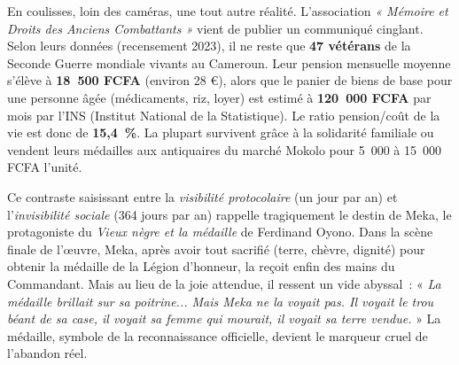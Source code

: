 \documentclass[11pt]{article}
\newcommand{\cle}[1]{{\popxbold\color{popdark}#1}}
\begin{document}
\noindent En coulisses, loin des caméras, une tout autre réalité. L'association \emph{« Mémoire et Droits des Anciens Combattants »} vient de publier un communiqué cinglant. Selon leurs données (recensement 2023), il ne reste que \textbf{47 vétérans} de la Seconde Guerre mondiale vivants au Cameroun. Leur pension mensuelle moyenne s'élève à \textbf{18~500 FCFA} (environ 28 €), alors que le panier de biens de base pour une personne âgée (médicaments, riz, loyer) est estimé à \textbf{120~000 FCFA} par mois par l'INS (Institut National de la Statistique). Le ratio pension/coût de la vie est donc de \textbf{15,4~\%}. La plupart survivent grâce à la solidarité familiale ou vendent leurs médailles aux antiquaires du marché Mokolo pour 5~000 à 15~000 FCFA l'unité.

\noindent Ce contraste saisissant entre la \emph{visibilité protocolaire} (un jour par an) et l'\emph{invisibilité sociale} (364 jours par an) rappelle tragiquement le destin de \cle{Meka}, le protagoniste du \emph{Vieux nègre et la médaille} de Ferdinand Oyono. Dans la scène finale de l'œuvre, Meka, après avoir tout sacrifié (terre, chèvre, dignité) pour obtenir la médaille de la Légion d'honneur, la reçoit enfin des mains du Commandant. Mais au lieu de la joie attendue, il ressent un vide abyssal~: « \emph{La médaille brillait sur sa poitrine... Mais Meka ne la voyait pas. Il voyait le trou béant de sa case, il voyait sa femme qui mourait, il voyait sa terre vendue.} » La médaille, symbole de la reconnaissance officielle, devient le marqueur cruel de l'abandon réel.
\end{document}
